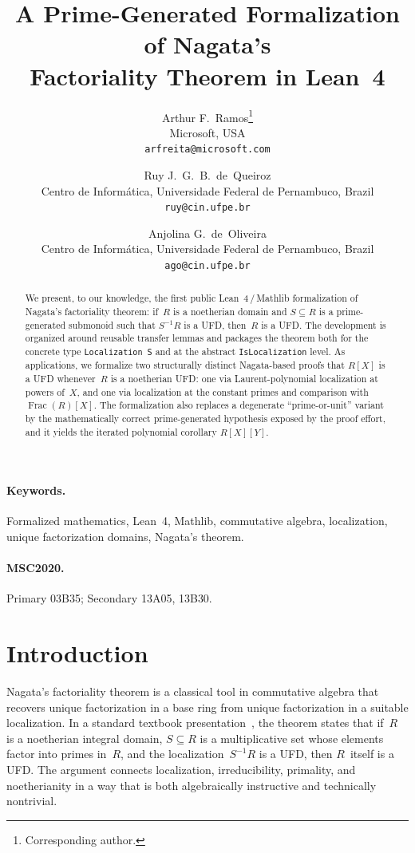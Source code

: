 \documentclass[11pt]{article}
\title{A Prime-Generated Formalization of Nagata's\\
       Factoriality Theorem in Lean~4}
\author{
Arthur F.~Ramos\thanks{Corresponding author.}\\
Microsoft, USA\\
\texttt{arfreita@microsoft.com}
\and
Ruy J.~G.~B.~de~Queiroz\\
Centro de Inform\'atica, Universidade Federal de Pernambuco, Brazil\\
\texttt{ruy@cin.ufpe.br}
\and
Anjolina G.~de~Oliveira\\
Centro de Inform\'atica, Universidade Federal de Pernambuco, Brazil\\
\texttt{ago@cin.ufpe.br}
}
\date{}
\theoremstyle{plain}
\theoremstyle{definition}
\theoremstyle{remark}
\newcommand{\li}[1]{\texorpdfstring{\texttt{#1}}{#1}}
\begin{document}
\maketitle


\begin{abstract}
We present, to our knowledge, the first public Lean~4\,/\,Mathlib
formalization of Nagata's factoriality theorem: if~$R$ is a noetherian domain
and $S\subseteq R$ is a prime-generated submonoid such that $S^{-1}R$ is a
UFD, then~$R$ is a UFD.  The development is organized around reusable transfer
lemmas and packages the theorem both for the concrete type
\li{Localization\,S} and at the abstract \li{IsLocalization} level.  As
applications, we formalize two structurally distinct Nagata-based proofs that
$R[X]$ is a UFD whenever~$R$ is a noetherian UFD: one via Laurent-polynomial
localization at powers of~$X$, and one via localization at the constant primes
and comparison with~$\operatorname{Frac}(R)[X]$.  The formalization also
replaces a degenerate ``prime-or-unit'' variant by the mathematically correct
prime-generated hypothesis exposed by the proof effort, and it yields the
iterated polynomial corollary $R[X][Y]$.
\end{abstract}

\paragraph{Keywords.}
Formalized mathematics, Lean~4, Mathlib, commutative algebra, localization,
unique factorization domains, Nagata's theorem.

\paragraph{MSC2020.}
Primary 03B35; Secondary 13A05, 13B30.


\section{Introduction}\label{sec:intro}

Nagata's factoriality theorem is a classical tool in commutative algebra that
recovers unique factorization in a base ring from unique factorization in a
suitable localization.  In a standard textbook
presentation~\cite{nagata1962,samuel1964,matsumura1989,kaplansky1970}, the
theorem states that if~$R$ is a noetherian integral domain, $S\subseteq R$ is
a multiplicative set whose elements factor into primes in~$R$, and the
localization~$S^{-1}R$ is a UFD, then $R$~itself is a UFD.  The argument
connects localization, irreducibility, primality, and noetherianity in a way
that is both algebraically instructive and technically nontrivial.
\end{document}
